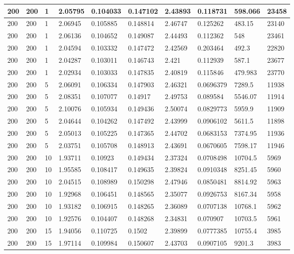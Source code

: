 \begin{landscape}
\begin{longtable}{ | l | l | l | l | l | l | l | l | l | l | }
200 & 200 & 1 & 2.05795 & 0.104033 & 0.147102 & 2.43893 & 0.118731 & 598.066 & 23458\\ \hline
200 & 200 & 1 & 2.06945 & 0.105885 & 0.148814 & 2.46747 & 0.125262 & 483.15 & 23140\\ \hline
200 & 200 & 1 & 2.06136 & 0.104652 & 0.149087 & 2.44493 & 0.112362 & 548 & 23461\\ \hline
200 & 200 & 1 & 2.04594 & 0.103332 & 0.147472 & 2.42569 & 0.203464 & 492.3 & 22820\\ \hline
200 & 200 & 1 & 2.04287 & 0.103011 & 0.146743 & 2.421 & 0.112939 & 587.1 & 23677\\ \hline
200 & 200 & 1 & 2.02934 & 0.103033 & 0.147835 & 2.40819 & 0.115846 & 479.983 & 23770\\ \hline
200 & 200 & 5 & 2.06091 & 0.106334 & 0.147903 & 2.46321 & 0.0696379 & 7289.5 & 11938\\ \hline
200 & 200 & 5 & 2.08351 & 0.107077 & 0.14917 & 2.49753 & 0.089584 & 5546.07 & 11914\\ \hline
200 & 200 & 5 & 2.10076 & 0.105934 & 0.149436 & 2.50074 & 0.0829773 & 5959.9 & 11909\\ \hline
200 & 200 & 5 & 2.04644 & 0.104262 & 0.147492 & 2.43999 & 0.0906102 & 5611.5 & 11898\\ \hline
200 & 200 & 5 & 2.05013 & 0.105225 & 0.147365 & 2.44702 & 0.0683153 & 7374.95 & 11936\\ \hline
200 & 200 & 5 & 2.03751 & 0.105708 & 0.148913 & 2.43691 & 0.0670605 & 7598.17 & 11946\\ \hline
200 & 200 & 10 & 1.93711 & 0.10923 & 0.149434 & 2.37324 & 0.0708498 & 10704.5 & 5969\\ \hline
200 & 200 & 10 & 1.95585 & 0.108417 & 0.149635 & 2.39824 & 0.0910348 & 8251.45 & 5960\\ \hline
200 & 200 & 10 & 2.04515 & 0.108989 & 0.150298 & 2.47946 & 0.0850481 & 8814.92 & 5963\\ \hline
200 & 200 & 10 & 1.92968 & 0.106451 & 0.148565 & 2.35077 & 0.0926753 & 8167.34 & 5958\\ \hline
200 & 200 & 10 & 1.93182 & 0.106915 & 0.148265 & 2.36089 & 0.0707138 & 10768.1 & 5962\\ \hline
200 & 200 & 10 & 1.92576 & 0.104407 & 0.148268 & 2.34831 & 0.070907 & 10703.5 & 5961\\ \hline
200 & 200 & 15 & 1.94056 & 0.110725 & 0.1502 & 2.39899 & 0.0777385 & 10755.4 & 3985\\ \hline
200 & 200 & 15 & 1.97114 & 0.109984 & 0.150607 & 2.43703 & 0.0907105 & 9201.3 & 3983\\ \hline

\end{longtable}
\end{landscape}
